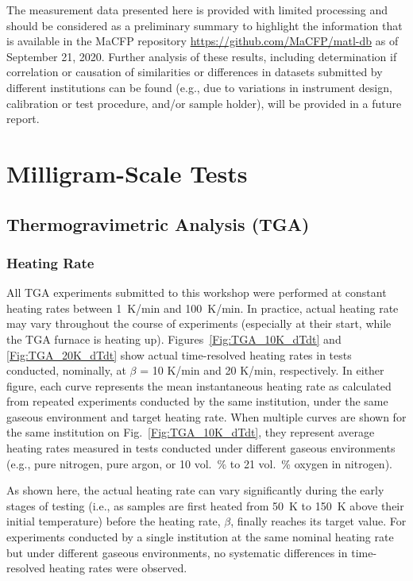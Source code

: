 \documentclass{book}
\begin{document}
The measurement data presented here is provided with limited processing and should be considered as a preliminary summary to highlight the information that is available in the MaCFP repository \href{https://github.com/MaCFP/matl-db}{https://github.com/MaCFP/matl-db} as of September 21, 2020. Further analysis of these results, including determination if correlation or causation of similarities or differences in datasets submitted by different institutions can be found (e.g., due to variations in instrument design, calibration or test procedure, and/or sample holder), will be provided in a future report.

\section{Milligram-Scale Tests}

\subsection{Thermogravimetric Analysis (TGA)}
\label{TGA_analysis}

\subsubsection{Heating Rate}

All TGA experiments submitted to this workshop were performed at constant heating rates between 1~K/min and 100~K/min. In practice, actual heating rate may vary throughout the course of experiments (especially at their start, while the TGA furnace is heating up). Figures~\ref{Fig:TGA_10K_dTdt} and \ref{Fig:TGA_20K_dTdt} show actual time-resolved heating rates in tests conducted, nominally, at $\beta$ = 10 K/min and 20 K/min, respectively. In either figure, each curve represents the mean instantaneous heating rate as calculated from repeated experiments conducted by the same institution, under the same gaseous environment and target heating rate. When multiple curves are shown for the same institution on Fig.~\ref{Fig:TGA_10K_dTdt}, they represent average heating rates measured in tests conducted under different gaseous environments (e.g., pure nitrogen, pure argon, or 10 vol.~\% to 21 vol.~\% oxygen in nitrogen).

As shown here, the actual heating rate can vary significantly during the early stages of testing (i.e., as samples are first heated from 50~K to 150~K above their initial temperature) before the heating rate, $\beta$, finally reaches its target value. For experiments conducted by a single institution at the same nominal heating rate but under different gaseous environments, no systematic differences in time-resolved heating rates were observed.
\end{document}
